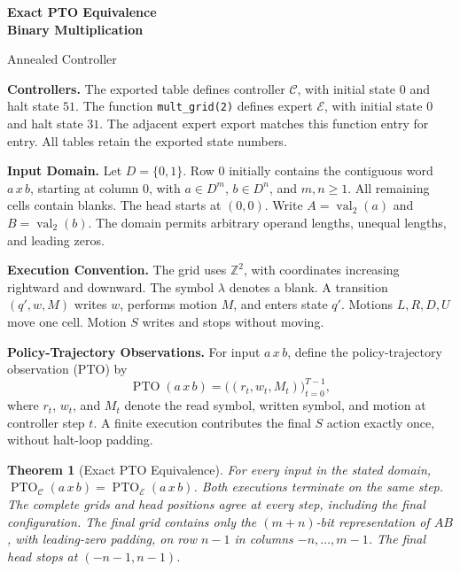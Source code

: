 \documentclass[11pt,a4paper]{article}
\date{}
\newcommand{\blank}{\lambda}
\newcommand{\digits}{\{0,1\}}
\newcommand{\EXPERT}{\mathcal E}
\newcommand{\CTRL}{\mathcal C}
\newcommand{\PTO}{\operatorname{PTO}}
\newcommand{\code}[1]{\texttt{#1}}
\newtheorem{theorem}{Theorem}
\newcommand{\sectiontitle}[2]{\refstepcounter{section}\vspace*{2pt}{\LARGE\bfseries\color{Teal}\thesection\quad #2}\par\vspace{7pt}}
\begin{document}
{\Huge\bfseries Exact PTO Equivalence\\[3pt]Binary Multiplication}\par
\vspace{10pt}
{\Large Annealed Controller}\par
{\small\color{Muted}}\par
\vspace{7pt}

\vspace{4pt}
\sectiontitle{1 \enspace STATEMENT AND SCOPE}{Statement and Scope}\label{sec:common1}
\textbf{Controllers.}
The exported table  defines controller
$\CTRL$, with initial state $0$ and halt state $51$.
The function \code{mult\_grid(2)} defines expert $\EXPERT$, with initial
state $0$ and halt state $31$. The adjacent expert export matches
this function entry for entry. All tables retain the exported state numbers.

\textbf{Input Domain.}
Let $D=\digits$. Row $0$ initially contains the contiguous word $a\,x\,b$,
starting at column $0$, with $a\in D^m$, $b\in D^n$, and $m,n\ge1$.
All remaining cells contain blanks. The head starts at $(0,0)$.
Write $A=\operatorname{val}_{2}(a)$ and $B=\operatorname{val}_{2}(b)$.
The domain permits arbitrary operand lengths, unequal lengths, and leading zeros.

\textbf{Execution Convention.}
The grid uses $\mathbb Z^2$, with coordinates increasing rightward and
downward. The symbol $\blank$ denotes a blank. A transition
$(q',w,M)$ writes $w$, performs motion $M$, and enters state $q'$.
Motions $L,R,D,U$ move one cell. Motion $S$ writes and stops without moving.

\textbf{Policy-Trajectory Observations.}
For input $a\,x\,b$, define the policy-trajectory observation (PTO) by
\[
\PTO(a\,x\,b)=\bigl((r_t,w_t,M_t)\bigr)_{t=0}^{T-1},
\]
where $r_t$, $w_t$, and $M_t$ denote the read symbol, written symbol,
and motion at controller step $t$. A finite execution contributes the final
$S$ action exactly once, without halt-loop padding.

\begin{theorem}[Exact PTO Equivalence]\label{thm:main}
For every input in the stated domain,
$\PTO_{\CTRL}(a\,x\,b)=\PTO_{\EXPERT}(a\,x\,b)$.
Both executions terminate on the same step. The complete grids and head
positions agree at every step, including the final configuration.
The final grid contains only the $(m+n)$-bit representation of $AB$,
with leading-zero padding, on row $n-1$ in columns $-n,\ldots,m-1$.
The final head stops at $(-n-1,n-1)$.
\end{theorem}
\end{document}
